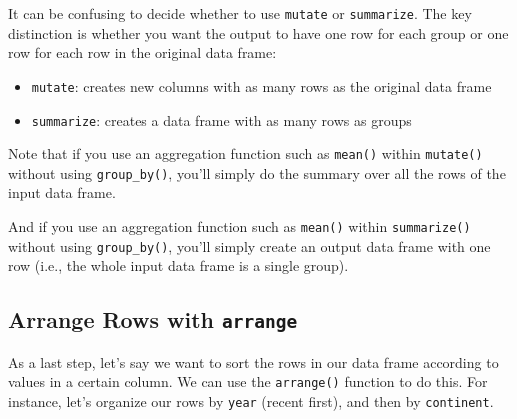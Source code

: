 \documentclass[]{book}
\newenvironment{Shaded}{\begin{snugshade}}{\end{snugshade}}
\newcommand{\KeywordTok}[1]{\textcolor[rgb]{0.13,0.29,0.53}{\textbf{#1}}}
\newcommand{\DataTypeTok}[1]{\textcolor[rgb]{0.13,0.29,0.53}{#1}}
\newcommand{\StringTok}[1]{\textcolor[rgb]{0.31,0.60,0.02}{#1}}
\newcommand{\OperatorTok}[1]{\textcolor[rgb]{0.81,0.36,0.00}{\textbf{#1}}}
\newcommand{\NormalTok}[1]{#1}
\providecommand{\tightlist}{%
  \setlength{\itemsep}{0pt}\setlength{\parskip}{0pt}}
\begin{document}
It can be confusing to decide whether to use \texttt{mutate} or
\texttt{summarize}. The key distinction is whether you want the output
to have one row for each group or one row for each row in the original
data frame:

\begin{itemize}
\tightlist
\item
  \texttt{mutate}: creates new columns with as many rows as the original
  data frame
\item
  \texttt{summarize}: creates a data frame with as many rows as groups
\end{itemize}

Note that if you use an aggregation function such as \texttt{mean()}
within \texttt{mutate()} without using \texttt{group\_by()}, you'll
simply do the summary over all the rows of the input data frame.

And if you use an aggregation function such as \texttt{mean()} within
\texttt{summarize()} without using \texttt{group\_by()}, you'll simply
create an output data frame with one row (i.e., the whole input data
frame is a single group).

\subsection{\texorpdfstring{Arrange Rows with
\texttt{arrange}}{Arrange Rows with arrange}}\label{arrange-rows-with-arrange}

As a last step, let's say we want to sort the rows in our data frame
according to values in a certain column. We can use the
\texttt{arrange()} function to do this. For instance, let's organize our
rows by \texttt{year} (recent first), and then by \texttt{continent}.

\begin{Shaded}
\end{Shaded}
\end{document}

